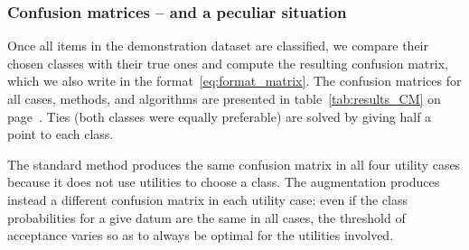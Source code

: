 \documentclass[\ifafour a4paper,12pt,\else a5paper,10pt,\fi%
onecolumn,oneside,article,%
british%
]{memoir}
\theoremstyle{remark}
\theoremstyle{innote}
\renewcommand*{\|}[1][]{\nonscript\:#1\vert\nonscript\:\mathopen{}}
\begin{document}
\subsubsection{Confusion matrices -- and a peculiar situation}

Once all items in the demonstration dataset are classified, we compare their chosen classes with their true ones and compute the resulting confusion matrix, which we also write in the format~\eqref{eq:format_matrix}. The confusion matrices for all cases, methods, and algorithms are presented in table~\ref{tab:results_CM} on page~\pageref{tab:results_CM}. Ties (both classes were equally preferable) are solved by giving half a point to each class.

The standard method produces the same confusion matrix in all four utility cases because it does not use utilities to choose a class. The augmentation produces instead a different confusion matrix in each utility case: even if the class probabilities for a give datum are the same in all cases, the threshold of acceptance varies so as to always be optimal for the utilities involved.
\end{document}

